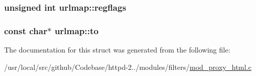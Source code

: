 \subsubsection[{\texorpdfstring{regflags}{regflags}}]{\setlength{\rightskip}{0pt plus 5cm}unsigned {\bf int} urlmap\+::regflags}\hypertarget{structurlmap_a2fe6577b3bc7b04ad299fe4abd145230}{}\label{structurlmap_a2fe6577b3bc7b04ad299fe4abd145230}
\subsubsection[{\texorpdfstring{to}{to}}]{\setlength{\rightskip}{0pt plus 5cm}const char$\ast$ urlmap\+::to}\hypertarget{structurlmap_a02418042d8574b1906fa9046e74dfc28}{}\label{structurlmap_a02418042d8574b1906fa9046e74dfc28}


The documentation for this struct was generated from the following file\+:\begin{DoxyCompactItemize}
\item 
/usr/local/src/github/\+Codebase/httpd-\/2../modules/filters/\hyperlink{mod__proxy__html_8c}{mod\+\_\+proxy\+\_\+html.\+c}\end{DoxyCompactItemize}
